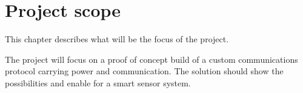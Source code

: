 \chapter{Project scope}

This chapter describes what will be the focus of the project.

The project will focus on a proof of concept build of a custom communications protocol carrying power and communication. The solution should show the possibilities and enable for a smart sensor system.\\


